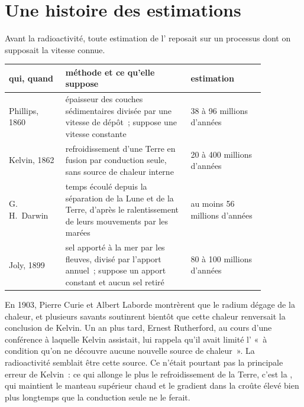 \section{Une histoire des estimations}

Avant la radioactivité, toute estimation de l' reposait sur
un processus dont on supposait la vitesse connue.

\begin{center}
\small
\begin{tabular}{|p{0.19\linewidth}|p{0.42\linewidth}|p{0.25\linewidth}|}
\hline
qui, quand & méthode et ce qu'elle suppose & estimation \\
\hline
Phillips, 1860 & épaisseur des couches sédimentaires divisée par une vitesse de dépôt~; suppose une vitesse constante & 38 à 96 millions d'années \\
Kelvin, 1862 & refroidissement d'une Terre en fusion par conduction seule, sans source de chaleur interne & 20 à 400 millions d'années \\
G.\,H.~Darwin & temps écoulé depuis la séparation de la Lune et de la Terre, d'après le ralentissement de leurs mouvements par les marées & au moins 56 millions d'années \\
Joly, 1899 & sel apporté à la mer par les fleuves, divisé par l'apport annuel~; suppose un apport constant et aucun sel retiré & 80 à 100 millions d'années \\
\hline
\end{tabular}
\end{center}

\begin{history}
En 1903, Pierre Curie et Albert Laborde montrèrent que le radium dégage de
la chaleur, et plusieurs savants soutinrent bientôt que cette chaleur
renversait la conclusion de Kelvin. Un an plus tard, Ernest Rutherford, au
cours d'une conférence à laquelle Kelvin assistait, lui rappela qu'il avait
limité l' «~à condition qu'on ne découvre aucune nouvelle
source de chaleur~». La radioactivité semblait être cette source. Ce
n'était pourtant pas la principale erreur de Kelvin~: ce qui allonge le
plus le refroidissement de la Terre, c'est la , qui
maintient le manteau supérieur chaud et le gradient dans la croûte élevé
bien plus longtemps que la conduction seule ne le ferait.
\end{history}

